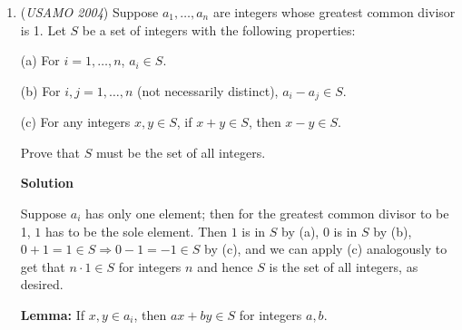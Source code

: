 \begin{enumerate}
 Now, draw diagonal $BD$. By the law of cosines, $c^2 + d^2 + 2cd\cos A = BD$. Since each of the interior and exterior angles of the quadrilateral is at least 60 degrees, we have that $A\in [60^{\circ},120^{\circ}]$. Cosine is monotonically decreasing on this interval, so by setting $A$ at the extreme values, we see that $c^2 + d^2 - cd\le BD^2 \le c^2 + d^2 + cd$. Applying the law of cosines analogously to $a$ and $b$, we see that $a^2 + b^2 - ab\le BD^2 \le a^2 + b^2 + ab$; we hence have $c^2 + d^2 - cd\le BD^2 \le a^2 + b^2 + ab$ and $a^2 + b^2 - ab\le BD^2 \le c^2 + d^2 + cd$. 

 We wrap up first by considering the second inequality. Because $c^2 + d^2 - cd\le BD^2 \le a^2 + b^2 + ab$, $\text{RHS}\ge 3(a^2 + b^2 - ab)$. This latter expression is of course greater than or equal to $a^2 + b^2 + ab$ because the inequality can be rearranged to $2(a - b)^2\ge 0$, which is always true. Multiply the first inequality by $3$ and we see that it is simply the second inequality with the variables swapped; hence by symmetry it is true as well.

 Equality occurs when $a = b$ and $c = d$, or when $ABCD$ is a kite.

 \textbf{Resources} 


	\item (\textit{USAMO 2004}) Suppose $a_1, \ldots, a_n$ are integers whose greatest common divisor is 1.  Let $S$ be a set of integers with the following properties:


 (a) For $i = 1, \ldots , n$, $a_i \in S$. 

(b) For $i, j = 1, \ldots, n$ (not necessarily distinct), $a_i - a_j \in S$. 

(c) For any integers $x, y \in S$, if $x+y \in S$, then $x-y \in S$.


 Prove that $S$ must be the set of all integers.


 



\textbf{Solution}

Suppose $a_i$ has only one element; then for the greatest common divisor to be 1, $1$ has to be the sole element. Then $1$ is in $S$ by (a), $0$ is in $S$ by (b), $0 + 1 = 1\in S\Rightarrow 0 - 1 = - 1\in S$ by (c), and we can apply (c) analogously to get that $n\cdot 1 \in S$ for integers $n$ and hence $S$ is the set of all integers, as desired.

 \textbf{Lemma:} If $x,y\in a_i$, then $ax + by\in S$ for integers $a,b$.


\end{enumerate}
